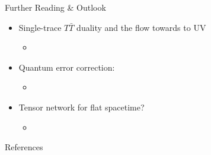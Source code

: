 \documentclass[aspectratio=169,10pt
	,noamsthm
]{beamer}
\begin{document}
\begin{frame}{Further Reading \& Outlook}
	\begin{itemize}
	\item Single-trace $T\bar{T}$ duality and the flow towards to UV
		\begin{itemize}
		\item {}
		\end{itemize}
	\item Quantum error correction:
		\begin{itemize}
		\item {}
		\end{itemize}
	\item Tensor network for flat spacetime?
		\begin{itemize}
		\item {}
		\end{itemize}
	\end{itemize}
\end{frame}


\begin{frame}[allowframebreaks]{References}
\renewcommand*{\bibfont}{\footnotesize}
\printbibliography[%
	,heading = bibintoc
]
\end{frame}
\end{document}
